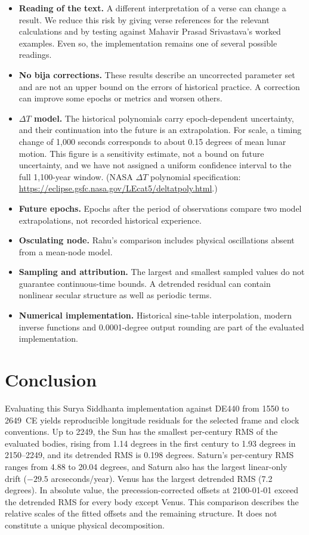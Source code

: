 \documentclass[11pt,a4paper]{article}
\newcommand{\dT}{$\Delta T$}
\begin{document}
\begin{itemize}
  \item \textbf{Reading of the text.} A different interpretation of a verse can change a result. We reduce this risk by giving verse references for the relevant calculations and by testing against Mahavir Prasad Srivastava's worked examples. Even so, the implementation remains one of several possible readings.
  \item \textbf{No bija corrections.} These results describe an uncorrected parameter set and are not an upper bound on the errors of historical practice. A correction can improve some epochs or metrics and worsen others.
  \item \textbf{\dT{} model.} The historical polynomials carry epoch-dependent uncertainty, and their continuation into the future is an extrapolation. For scale, a timing change of 1,000 seconds corresponds to about 0.15 degrees of mean lunar motion. This figure is a sensitivity estimate, not a bound on future uncertainty, and we have not assigned a uniform confidence interval to the full 1,100-year window. (NASA \dT{} polynomial specification: \url{https://eclipse.gsfc.nasa.gov/LEcat5/deltatpoly.html}.)
  \item \textbf{Future epochs.} Epochs after the period of observations compare two model extrapolations, not recorded historical experience.
  \item \textbf{Osculating node.} Rahu's comparison includes physical oscillations absent from a mean-node model.
  \item \textbf{Sampling and attribution.} The largest and smallest sampled values do not guarantee continuous-time bounds. A detrended residual can contain nonlinear secular structure as well as periodic terms.
  \item \textbf{Numerical implementation.} Historical sine-table interpolation, modern inverse functions and 0.0001-degree output rounding are part of the evaluated implementation.
\end{itemize}

\section{Conclusion}
\label{sec:conclusion}

Evaluating this Surya Siddhanta implementation against DE440 from 1550 to 2649~CE yields reproducible longitude residuals for the selected frame and clock conventions. Up to 2249, the Sun has the smallest per-century RMS of the evaluated bodies, rising from 1.14 degrees in the first century to 1.93 degrees in 2150--2249, and its detrended RMS is 0.198 degrees. Saturn's per-century RMS ranges from 4.88 to 20.04 degrees, and Saturn also has the largest linear-only drift ($-29.5$ arcseconds/year). Venus has the largest detrended RMS (7.2 degrees). In absolute value, the precession-corrected offsets at 2100-01-01 exceed the detrended RMS for every body except Venus. This comparison describes the relative scales of the fitted offsets and the remaining structure. It does not constitute a unique physical decomposition.
\end{document}
